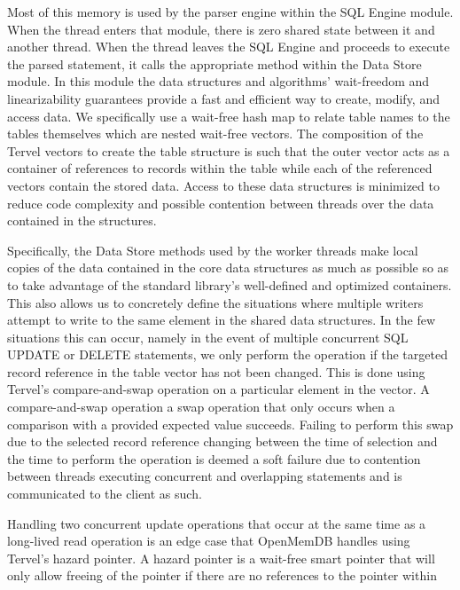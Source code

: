 \documentclass[letter,11pt]{article}
\begin{document}
Most of this memory is used by the parser engine within the SQL Engine module. When the 
thread enters that module, there is zero shared state between it and another thread. When the thread
leaves the SQL Engine and proceeds to execute the parsed statement, it calls the appropriate
method within the Data Store module. In this module the data structures and algorithms' wait-freedom and 
linearizability guarantees provide a fast and efficient way to create, modify, and access data.
We specifically use a wait-free hash map to relate table names to the tables themselves which are nested
wait-free vectors. The composition of the Tervel vectors to create the table structure is such that the outer
vector acts as a container of references to records within the table while each of the referenced vectors
contain the stored data. Access to these data structures is minimized to reduce code complexity and 
possible contention between threads over the data contained in the structures.
\par\vspace{\baselineskip}
Specifically, the Data Store methods used by the worker threads make local copies of the data contained
in the core data structures as much as possible so as to take advantage of the standard library's
well-defined and optimized containers. This also allows us to concretely define the situations where 
multiple writers attempt to write to the same element in the shared data structures. In the few situations
this can occur, namely in the event of multiple concurrent SQL UPDATE or DELETE statements, we only perform
the operation if the targeted record reference in the table vector has not been changed. This is done using 
Tervel's compare-and-swap operation on a particular element in the vector. A compare-and-swap operation a 
swap operation that only occurs when a comparison with a provided expected value succeeds. Failing to 
perform this swap due to the selected record reference changing between the time of selection and the 
time to perform the operation is deemed a soft failure due to contention between threads executing 
concurrent and overlapping statements and is communicated to the client as such.
\par\vspace{\baselineskip}
Handling two concurrent update operations that occur at the same time as a long-lived read operation
is an edge case that OpenMemDB handles using Tervel's hazard pointer. A hazard pointer is a wait-free 
smart pointer that will only allow freeing of the pointer if there are no references to the pointer within
\end{document}
